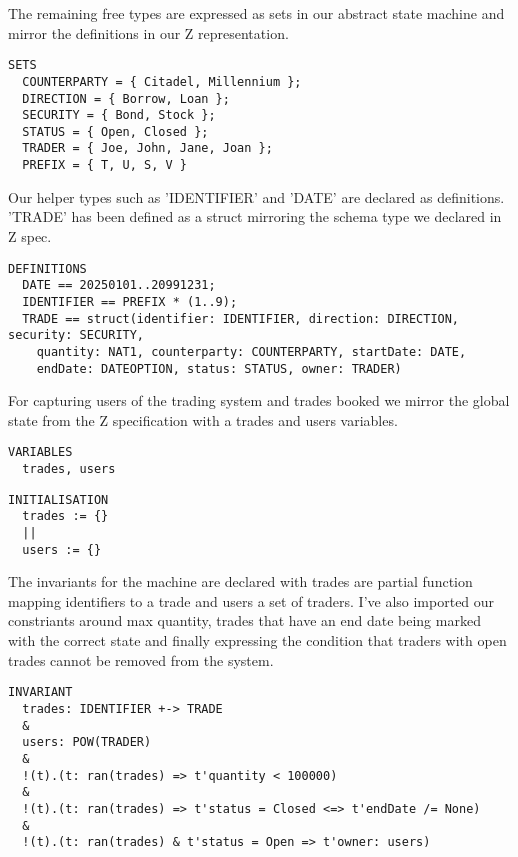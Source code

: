 \documentclass{article}
\begin{document}
\hspace{-0.7cm} The remaining free types are expressed as sets in our abstract state machine and mirror the definitions in our Z representation.

\begin{verbatim}
SETS 
  COUNTERPARTY = { Citadel, Millennium };
  DIRECTION = { Borrow, Loan };
  SECURITY = { Bond, Stock };
  STATUS = { Open, Closed };
  TRADER = { Joe, John, Jane, Joan };
  PREFIX = { T, U, S, V }
\end{verbatim}

\hspace{-0.7cm} Our helper types such as 'IDENTIFIER' and 'DATE' are declared as definitions. 'TRADE' has been defined as a struct mirroring the schema type we declared in Z spec.

\begin{verbatim}
DEFINITIONS
  DATE == 20250101..20991231;
  IDENTIFIER == PREFIX * (1..9);
  TRADE == struct(identifier: IDENTIFIER, direction: DIRECTION, security: SECURITY, 
    quantity: NAT1, counterparty: COUNTERPARTY, startDate: DATE, 
    endDate: DATEOPTION, status: STATUS, owner: TRADER)
\end{verbatim}

\hspace{-0.7cm} For capturing users of the trading system and trades booked we mirror the global state from the Z specification with a trades and users variables.

\begin{verbatim}
VARIABLES
  trades, users
\end{verbatim}

\begin{verbatim}
INITIALISATION
  trades := {}
  ||
  users := {}
\end{verbatim}
    
\hspace{-0.7cm} The invariants for the machine are declared with trades are partial function mapping identifiers to a trade and users a set of traders. I've also imported our constriants around max quantity, trades that have an end date being marked with the correct state and finally expressing the condition that traders with open trades cannot be removed from the system.

\begin{verbatim}
INVARIANT
  trades: IDENTIFIER +-> TRADE
  &
  users: POW(TRADER)    
  &
  !(t).(t: ran(trades) => t'quantity < 100000)
  &
  !(t).(t: ran(trades) => t'status = Closed <=> t'endDate /= None)
  &
  !(t).(t: ran(trades) & t'status = Open => t'owner: users)
\end{verbatim}
\end{document}

